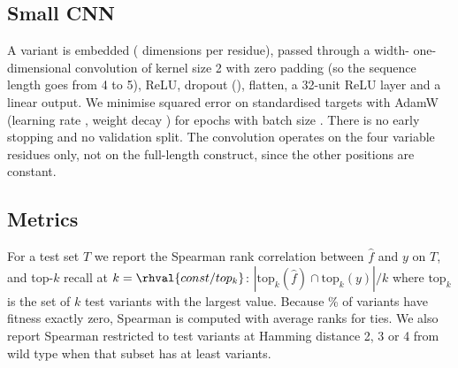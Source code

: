\subsection{Small CNN}
A variant is embedded ( dimensions per residue), passed through a width- one-dimensional convolution of kernel size 2 with zero padding (so the sequence length goes from 4 to 5), ReLU, dropout (), flatten, a 32-unit ReLU layer and a linear output. We minimise squared error on standardised targets with AdamW (learning rate , weight decay ) for  epochs with batch size . There is no early stopping and no validation split. The convolution operates on the four variable residues only, not on the full-length construct, since the other positions are constant.

\subsection{Metrics}
For a test set $T$ we report the Spearman rank correlation between $\hat f$ and $y$ on $T$, and top-$k$ recall at $k=\rhval{const/top_k}$: $|\mathrm{top}_k(\hat f)\cap\mathrm{top}_k(y)|/k$ where $\mathrm{top}_k$ is the set of $k$ test variants with the largest value. Because \% of variants have fitness exactly zero, Spearman is computed with average ranks for ties. We also report Spearman restricted to test variants at Hamming distance 2, 3 or 4 from wild type when that subset has at least  variants.
